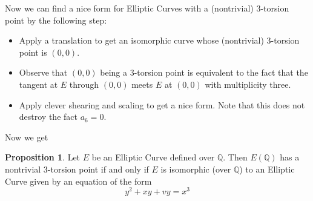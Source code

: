 \documentclass{scrartcl}
\newcommand{\Q}{\mathbb{Q}}
\theoremstyle{definition}
\newtheorem{prop}[subsection]{Proposition}
\begin{document}
Now we can find a nice form for Elliptic Curves with a (nontrivial) 3-torsion point by the following step:
\begin{itemize}
    \item Apply a translation to get an isomorphic curve whose (nontrivial) 3-torsion point is $(0, 0)$.
    \item Observe that $(0, 0)$ being a 3-torsion point is equivalent to the fact that the tangent at $E$ through $(0, 0)$ meets $E$ at $(0, 0)$ with multiplicity three.
    \item Apply clever shearing and scaling to get a nice form. Note that this does not destroy the fact $a_6 = 0$.
\end{itemize}
Now we get
\begin{prop}
    Let $E$ be an Elliptic Curve defined over $\Q$.
    Then $E(\Q)$ has a nontrivial 3-torsion point if and only if $E$ is isomorphic (over $\Q$) to an Elliptic Curve given by an equation of the form
    \begin{equation*}
        y^2 + x y + v y = x^3
    \end{equation*}
\end{prop}
\end{document}
